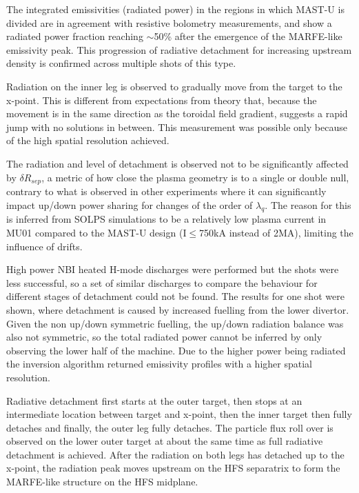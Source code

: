 The integrated emissivities (radiated power) in the regions in which MAST-U is divided are in agreement with resistive bolometry measurements, and show a radiated power fraction reaching $\sim$50\% after the emergence of the MARFE-like emissivity peak. This progression of radiative detachment for increasing upstream density is confirmed across multiple shots of this type.

Radiation on the inner leg is observed to gradually move from the target to the x-point. This is different from expectations from theory that, because the movement is in the same direction as the toroidal field gradient, suggests a rapid jump with no solutions in between. This measurement was possible only because of the high spatial resolution achieved.

The radiation and level of detachment is observed not to be significantly affected by $\delta R_{sep}$, a metric of how close the plasma geometry is to a single or double null, contrary to what is observed in other experiments where it can significantly impact up/down power sharing for changes of the order of $\lambda_q$. The reason for this is inferred from SOLPS simulations to be a relatively low plasma current in MU01 compared to the MAST-U design (I$\leq$750kA instead of 2MA), limiting the influence of drifts.

High power NBI heated H-mode discharges were performed but the shots were less successful, so a set of similar discharges to compare the behaviour for different stages of detachment could not be found. The results for one shot were shown, where detachment is caused by increased fuelling from the lower divertor. Given the non up/down symmetric fuelling, the up/down radiation balance was also not symmetric, so the total radiated power cannot be inferred by only observing the lower half of the machine. Due to the higher power being radiated the inversion algorithm returned emissivity profiles with a higher spatial resolution.

Radiative detachment first starts at the outer target, then stops at an intermediate location between target and x-point, then the inner target then fully detaches and finally, the outer leg fully detaches. The particle flux roll over is observed on the lower outer target at about the same time as full radiative detachment is achieved. After the radiation on both legs has detached up to the x-point, the radiation peak moves upstream on the HFS separatrix to form the MARFE-like structure on the HFS midplane. 

